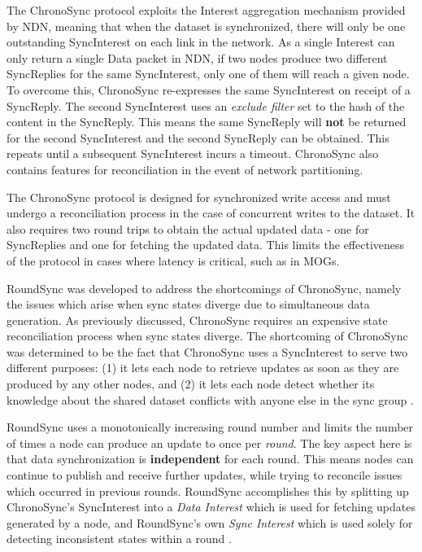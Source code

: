 The ChronoSync protocol exploits the Interest aggregation mechanism provided by NDN, meaning that when the dataset is synchronized, there will only be one outstanding SyncInterest on each link in the network. As a single Interest can only return a single Data packet in NDN, if two nodes produce two different SyncReplies for the same SyncInterest, only one of them will reach a given node. To overcome this, ChronoSync re-expresses the same SyncInterest on receipt of a SyncReply. The second SyncInterest uses an \textit{exclude filter} set to the hash of the content in the SyncReply. This means the same SyncReply will \textbf{not} be returned for the second SyncInterest and the second SyncReply can be obtained. This repeats until a subsequent SyncInterest incurs a timeout. ChronoSync also contains features for reconciliation in the event of network partitioning.

The ChronoSync protocol is designed for synchronized write access and must undergo a reconciliation process in the case of concurrent writes to the dataset. It also requires two round trips to obtain the actual updated data - one for SyncReplies and one for fetching the updated data. This limits the effectiveness of the protocol in cases where latency is critical, such as in MOGs.


RoundSync was developed to address the shortcomings of ChronoSync, namely the issues which arise when sync states diverge due to simultaneous data generation. As previously discussed, ChronoSync requires an expensive state reconciliation process when sync states diverge. The shortcoming of ChronoSync was determined to be the fact that ChronoSync uses a SyncInterest to serve two different purposes: (1) it lets each node to retrieve updates as soon as they are produced by any other nodes, and (2) it lets each node detect whether its knowledge about the shared dataset conflicts with anyone else in the sync group \cite{roundsync}.


RoundSync uses a monotonically increasing round number and limits the number of times a node can produce an update to once per \textit{round}. The key aspect here is that data synchronization is \textbf{independent} for each round. This means nodes can continue to publish and receive further updates, while trying to reconcile issues which occurred in previous rounds. RoundSync accomplishes this by splitting up ChronoSync's SyncInterest into a \textit{Data Interest} which is used for fetching updates generated by a node, and RoundSync's own \textit{Sync Interest} which is used solely for detecting inconsistent states within a round \cite{roundsync}.

